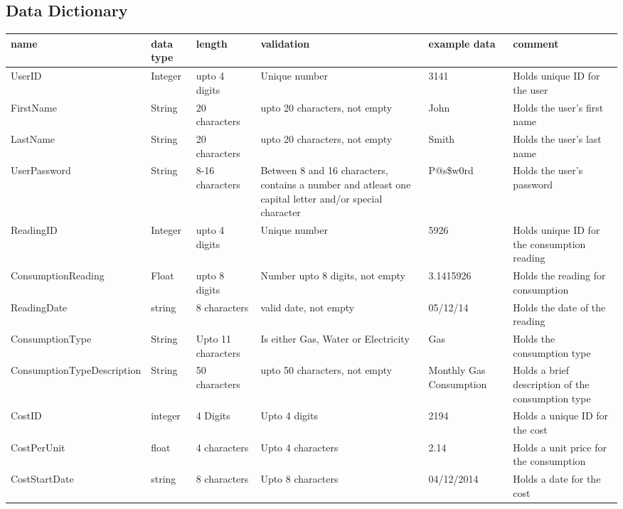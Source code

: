 \subsection{Data Dictionary}
\begin{center}
\begin{tabular}{|p{4.3cm}|p{1cm}|p{1.5cm}|p{3cm}|p{1.5cm}|p{2.5cm}|}
	\hline
	\textbf{name} & \textbf{data type} & \textbf{length} & \textbf{validation} & \textbf{example data} & \textbf{comment} \\ \hline
	UserID & Integer & upto 4 digits & Unique number & 3141 & Holds unique ID for the user \\ \hline
	FirstName & String & 20 characters & upto 20 characters, not empty & John & Holds the user's first name \\ \hline
	LastName & String & 20 characters & upto 20 characters, not empty & Smith & Holds the user's last name \\ \hline
	UserPassword & String & 8-16 characters & Between 8 and 16 characters, contains a number and atleast one capital letter and/or special character & P@s\$w0rd & Holds the user's password \\ \hline
	ReadingID & Integer & upto 4 digits & Unique number & 5926 & Holds unique ID for the consumption reading \\ \hline
	ConsumptionReading & Float & upto 8 digits & Number upto 8 digits, not empty & 3.1415926 & Holds the reading for consumption \\ \hline
	ReadingDate & string & 8 characters & valid date, not empty & 05/12/14 & Holds the date of the reading \\ \hline
	ConsumptionType & String & Upto 11 characters & Is either Gas, Water or Electricity & Gas & Holds the consumption type \\ \hline
	ConsumptionTypeDescription & String & 50 characters & upto 50 characters, not empty & Monthly Gas Consumption & Holds a brief description of the consumption type \\ \hline
	CostID & integer & 4 Digits & Upto 4 digits & 2194 & Holds a unique ID for the cost \\ \hline
	CostPerUnit & float & 4 characters & Upto 4 characters & 2.14 & Holds a unit price for the consumption \\ \hline
	CostStartDate & string & 8 characters & Upto 8 characters & 04/12/2014 & Holds a date for the cost \\ \hline
\end{tabular}
\end{center}
